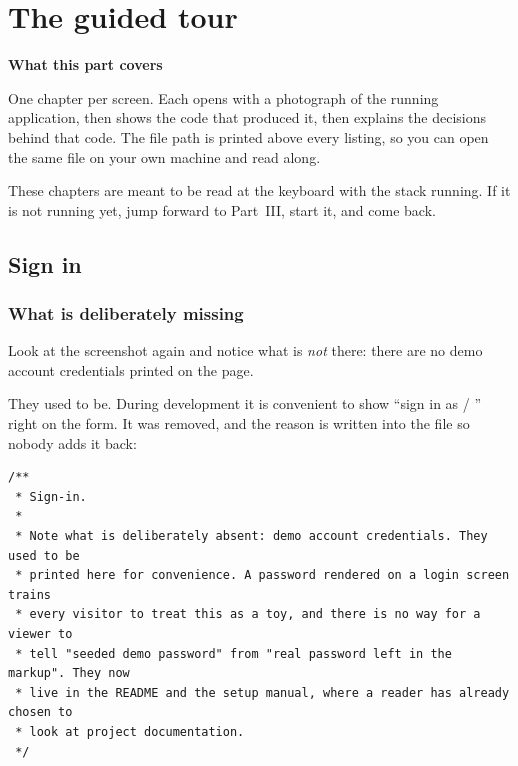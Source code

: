 \part{The guided tour}

\noindent\textbf{\large What this part covers}

\medskip
\noindent
One chapter per screen. Each opens with a photograph of the running application,
then shows the code that produced it, then explains the decisions behind that
code. The file path is printed above every listing, so you can open the same
file on your own machine and read along.

\medskip
\noindent
These chapters are meant to be read at the keyboard with the stack running. If
it is not running yet, jump forward to Part~III, start it, and come back.

\chapter{Sign in}
\label{ch:login}


\section{What is deliberately missing}

Look at the screenshot again and notice what is \emph{not} there: there are no
demo account credentials printed on the page.

They used to be. During development it is convenient to show ``sign in as
 / '' right on the form. It was removed,
and the reason is written into the file so nobody adds it back:

\begin{lstlisting}[language=tsx]
/**
 * Sign-in.
 *
 * Note what is deliberately absent: demo account credentials. They used to be
 * printed here for convenience. A password rendered on a login screen trains
 * every visitor to treat this as a toy, and there is no way for a viewer to
 * tell "seeded demo password" from "real password left in the markup". They now
 * live in the README and the setup manual, where a reader has already chosen to
 * look at project documentation.
 */
\end{lstlisting}


